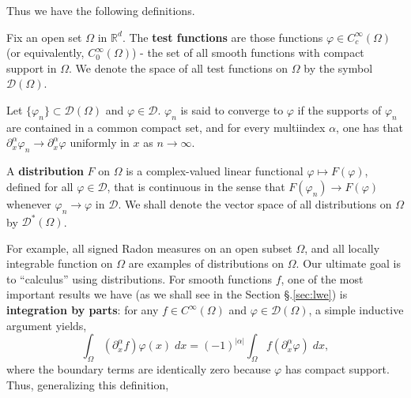 \documentclass{article}
\begin{document}
Thus we have the following definitions. 

\begin{definition}
Fix an open set $\Omega$ in $\mathbb{R}^{d}$. The \textbf{test functions} are those functions $\varphi \in C_{c}^{\infty}(\Omega)$ (or equivalently, $C_{0}^{\infty}(\Omega)$) - the set of all smooth functions with compact support in $\Omega$. We denote the space of all test functions on $\Omega$ by the symbol $\mathcal{D}(\Omega)$. 
\end{definition} 

\begin{definition}
	Let $\{\varphi_{n}\} \subset \mathcal{D}(\Omega)$ and $\varphi \in \mathcal{D}$. $\varphi_{n}$ is said to converge to $\varphi$ if the supports of $\varphi_{n}$ are contained in a common compact set, and for every multiindex $\alpha$, one has that $\partial_{x}^{\alpha} \varphi_{n} \to \partial_{x}^{\alpha}\varphi$ uniformly in $x$ as $n \to \infty$. 
\end{definition}

\begin{definition}
	A \textbf{distribution} $F$ on $\Omega$ is a complex-valued linear functional $\varphi \mapsto F(\varphi)$, defined for all $\varphi \in \mathcal{D}$, that is continuous in the sense that $F(\varphi_{n}) \to F(\varphi)$ whenever $\varphi_{n}\to \varphi$ in $\mathcal{D}$. We shall denote the vector space of all distributions on $\Omega$ by $\mathcal{D}^{\ast}(\Omega)$. 
\end{definition} 

For example, all signed Radon measures on an open subset $\Omega$, and all locally integrable function on $\Omega$ are examples of distributions on $\Omega$. Our ultimate goal is to ``calculus'' using distributions. For smooth functions $f$, one of the most important results we have (as we shall see in the Section \S.\ref{sec:lwe}) is \textbf{integration by parts}: for any $f \in C^{\infty}(\Omega)$ and $\varphi \in \mathcal{D}(\Omega)$, a simple inductive argument yields, 
\begin{equation*}
	\int_{\Omega}(\partial_{x}^{\alpha}f)\varphi(x)\;dx = (-1)^{|\alpha|}\int_{\Omega}f(\partial_{x}^{\alpha}\varphi)\;dx,  
\end{equation*}
where the boundary terms are identically zero because $\varphi$ has compact support. Thus, generalizing this definition, 
\end{document}
